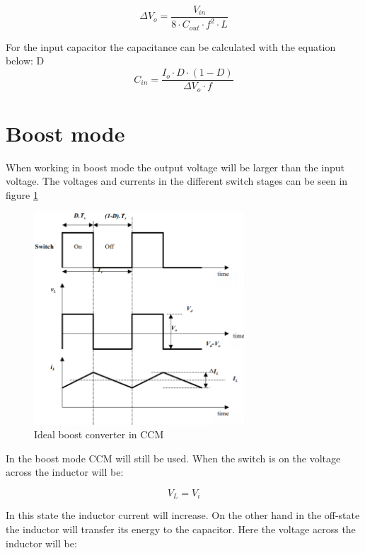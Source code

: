\begin{equation} \label{buckc} 
\Delta V_o = \frac{V_{in}}{8\cdot C_{out}\cdot f^2\cdot L}
\end{equation}    

For the input capacitor the capacitance can be calculated with the equation below:
D
\begin{equation}
\label{buckcin}
C_{in} = \frac{I_o\cdot D\cdot (1-D)}{\Delta V_o\cdot f}
\end{equation}  

\section{Boost mode}
When working in boost mode the output voltage will be larger than the input voltage. The voltages and currents in the different switch stages can be seen in figure \ref{CCM_boost}

\begin{figure}[htbp]
	\begin{center}
		\includegraphics[width=0.7\textwidth]{../Pictures/CCM_boost}
		\caption{Ideal boost converter in CCM}
		\label{CCM_boost}
	\end{center}	
\end{figure}
In the boost mode CCM will still be used. When the switch is on the voltage across the inductor will be:

\begin{equation}
V_L = V_i
\end{equation}

In this state the inductor current will increase. On the other hand in the off-state the inductor will transfer its energy to the capacitor. Here the voltage across the inductor will be:

